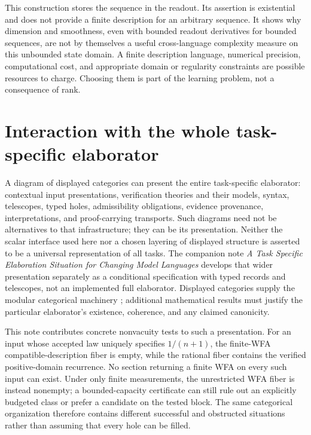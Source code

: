\documentclass[11pt]{article}
\theoremstyle{definition}
\begin{document}
This construction stores the sequence in the readout. Its assertion is
existential and does not provide a finite description for an arbitrary
sequence. It shows why dimension and smoothness, even with bounded
readout derivatives for bounded sequences, are not by themselves a useful
cross-language complexity measure on this unbounded state domain.
A finite description language, numerical precision, computational cost,
and appropriate domain or regularity constraints are possible resources
to charge. Choosing them is part of the learning problem, not a
consequence of rank.

\section{Interaction with the whole task-specific elaborator}
\label{sec:elaboration}

A diagram of displayed categories can present the entire task-specific
elaborator: contextual input presentations, verification theories and their
models, syntax, telescopes, typed holes, admissibility obligations, evidence
provenance, interpretations, and proof-carrying transports. Such diagrams
need not be alternatives to that infrastructure; they can be its presentation.
Neither the scalar interface used here nor a chosen layering of displayed
structure is asserted to be a universal representation of all tasks. The companion note
\emph{A Task Specific Elaboration Situation for Changing Model Languages}
develops that wider presentation separately as a conditional specification
with typed records and telescopes, not an implemented full elaborator.
Displayed categories supply the modular categorical machinery
\cite{cc-displayed}; additional mathematical results must justify the
particular elaborator's existence, coherence, and any claimed canonicity.

This note contributes concrete nonvacuity tests to such a presentation.
For an input whose accepted law uniquely specifies $1/(n+1)$, the
finite-WFA compatible-description fiber is empty, while the rational fiber
contains the verified positive-domain recurrence. No section returning a
finite WFA on every such input can exist. Under only finite measurements,
the unrestricted WFA fiber is instead nonempty; a bounded-capacity
certificate can still rule out an explicitly budgeted class or prefer a
candidate on the tested block. The same categorical organization therefore
contains different successful and obstructed situations rather than
assuming that every hole can be filled.
\end{document}
